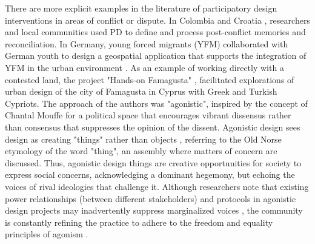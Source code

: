 \documentclass[dissertation,math,vertlayout,pdfa,colorlinks,nologo]{aaltoseries}
\begin{document}
There are more explicit examples in the literature of participatory design interventions in areas of conflict or dispute. In Colombia \cite{patarroyoTestimonialDigitalTextiles2019} and Croatia \cite{jolicBottomupVsTopdown2023}, researchers and local communities used PD to define and process post-conflict memories and reconciliation. In Germany, young forced migrants (YFM) collaborated with German youth to design a geospatial application that supports the integration of YFM in the urban environment \cite{duarteParticipatoryDesignParticipatory2018}. As an example of working directly with a contested land, the project "Hands-on Famagusta" \cite{stratisReclaimingPoliticalUrbanism2017}, facilitated explorations of urban design of the city of Famagusta in Cyprus with Greek and Turkish Cypriots. The approach of the authors was "agonistic", inspired by the concept of Chantal Mouffe \cite{mouffeAgonisticsThinkingWorld2013} for a political space that encourages vibrant dissensus rather than consensus that suppresses the opinion of the dissent. Agonistic design \cite{bjorgvinssonAgonisticParticipatoryDesign2012, disalvoAdversarialDesign2015} sees design as creating "things" rather than objects \cite{binderDesignThings2011}, referring to the Old Norse etymology of the word "thing", an assembly where matters of concern are discussed. Thus, agonistic design things are creative opportunities for society to express social concerns, acknowledging a dominant hegemony, but echoing the voices of rival ideologies that challenge it. Although researchers note that existing power relationships (between different stakeholders) and protocols in agonistic design projects may inadvertently suppress marginalized voices \cite{buschBetrayalPostpoliticalParticipation2023, markussenDisruptiveAestheticsDesign2013}, the community is constantly refining the practice to adhere to the freedom and equality principles of agonism \cite{geppertDesignEquivalenceAgonism2022}.
\end{document}

